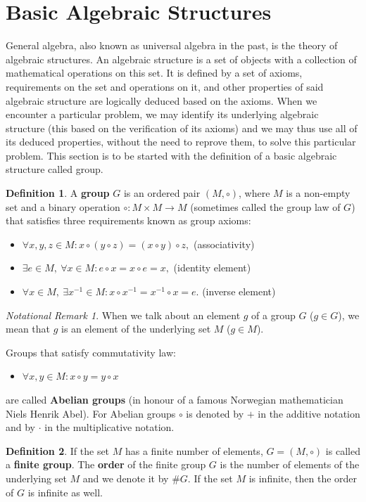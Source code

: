 \documentclass[thesis=M,english]{FITthesis}[2012/10/20]
\theoremstyle{remark}
\newtheorem*{NRM}{Notational Remark}
\theoremstyle{definition}
\newtheorem{DF}{Definition}[section]
\begin{document}
\section{Basic Algebraic Structures}
General algebra, also known as universal algebra in the past, is the theory of algebraic structures. An algebraic structure is a set of objects with a collection of mathematical operations on this set. It is defined by a set of axioms, requirements on the set and operations on it, and other properties of said algebraic structure are logically deduced based on the axioms. When we encounter a particular problem, we may identify its underlying algebraic structure (this based on the verification of its axioms) and we may thus use all of its deduced properties, without the need to reprove them, to solve this particular problem. This section is to be started with the definition of a basic algebraic structure called group.
\begin{DF}
A \textbf{group} $G$ is an ordered pair $(M,  \circ)$, where $M$ is a non-empty set and a binary operation $\circ : M \times M \to M $ (sometimes called the group law of $G$) that satisfies three requirements known as group axioms: 
\end{DF}
\begin{itemize}
\item 
$ \forall x,y,z \in M: x\circ (y \circ z) = (x \circ y) \circ z,$ \hfill (associativity)
\item 
$ \exists e \in M,\ \forall x \in M: e \circ x = x \circ e = x,$ \hfill (identity element)
\item 
$\forall x \in M,\ \exists x^{-1} \in M: x \circ x^{-1} = x^{-1} \circ x = e.$ \hfill (inverse element)
\end{itemize}
\begin{NRM}
When we talk about an element $g$ of a group $G$ ($g \in G$), we mean that $g$ is an element of the underlying set $M$ ($g \in M$).
\end{NRM}
Groups that satisfy commutativity law:
\begin{itemize}
\item 
$ \forall x, y\in M: x \circ y = y \circ x$
\end{itemize}
are called \textbf{Abelian groups} (in honour of a famous Norwegian mathematician Niels Henrik Abel). For Abelian groups $\circ$ is denoted by $+$ in the additive notation and by $\cdot$ in the multiplicative notation.
\begin{DF}
If the set $M$ has a finite number of elements, ${G = (M, \circ)}$ is called a \textbf{finite group}. The \textbf{order} of the finite group $G$ is the number of elements of the underlying set $M$ and we denote it by $\#G$. If the set $M$ is infinite, then the order of $G$ is infinite as well.
\end{DF}
\end{document}
